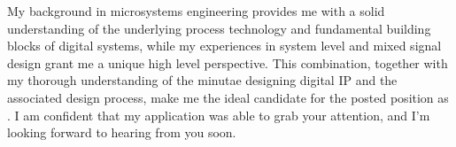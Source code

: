 
My background in microsystems engineering provides me with a solid understanding of the underlying process technology and fundamental building blocks of digital systems, while my experiences in system level and mixed signal design grant me a unique high level perspective. This combination, together with my thorough understanding of the minutae designing digital IP and the associated design process, make me the ideal candidate for the posted position as \stelleText. I am confident that my application was able to grab your attention, and I'm looking forward to hearing from you soon. 













